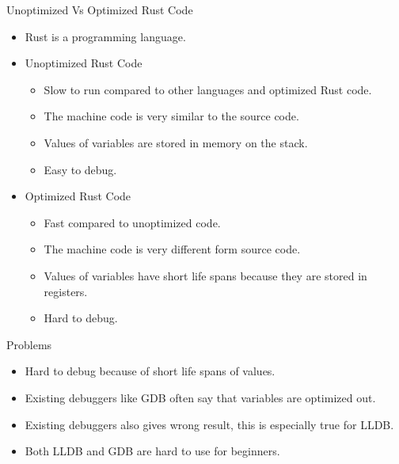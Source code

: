\begin{frame}{Unoptimized Vs Optimized Rust Code}
	\begin{itemize}
		\item Rust is a programming language.
    \item Unoptimized Rust Code
	    \begin{itemize}
        \item Slow to run compared to other languages and optimized Rust code.
        \item The machine code is very similar to the source code.
        \item Values of variables are stored in memory on the stack.
        \item Easy to debug.
	    \end{itemize}
    \item Optimized Rust Code
	    \begin{itemize}
        \item Fast compared to unoptimized code.
        \item The machine code is very different form source code.
        \item Values of variables have short life spans because they are stored in registers.
        \item Hard to debug.
	    \end{itemize}
	\end{itemize}
\end{frame}


\begin{frame}{Problems}
	\begin{itemize}
		\item Hard to debug because of short life spans of values.
		\item Existing debuggers like GDB often say that variables are optimized out.
		\item Existing debuggers also gives wrong result, this is especially true for LLDB.
		\item Both LLDB and GDB are hard to use for beginners.
	\end{itemize}
\end{frame}


